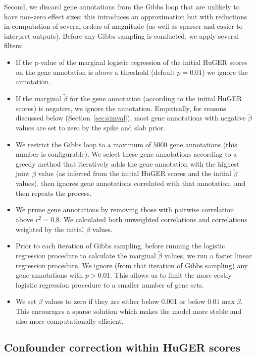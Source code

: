 {Second, we discard gene annotations from the Gibbs loop that are
unlikely to have non-zero effect sizes; this introduces an
approximation but with reductions in computation of several orders of
magnitude (as well as sparser and easier to interpret outputs). Before
any Gibbs sampling is conducted, we apply several filters:
\begin{itemize}
  \item If the p-value of the marginal logistic regression of the
    initial HuGER scores on the gene annotation is above a threshold
    (default $p=0.01$) we ignore the annotation.
  \item If the marginal $\tilde{\beta}$ for the gene annotation
    (according to the initial HuGER scores) is negative, we ignore the
    annotation. Empirically, for reasons discussed below (Section~\ref{sec:simval}),
    most gene annotations with negative $\tilde{\beta}$ values are set
    to zero by the spike and slab prior.
  \item We restrict the Gibbs loop to a maximum of $5000$ gene
    annotations (this number is configurable). We select these gene
    annotations according to a greedy method that iteratively adds the
    gene annotation with the highest joint $\beta$ value (as inferred from
    the initial HuGER scores and the initial $\tilde{\beta}$ values),
    then ignores gene annotations correlated with that annotation, and
    then repeats the process.
  \item We prune gene annotations by removing those with pairwise
    correlation above $r^2=0.8$. We calculated both unweighted
    correlations and correlations weighted by the initial $\beta$
    values.
  \item Prior to each iteration of Gibbs sampling, before running the
    logistic regression procedure to calculate the marginal
    $\tilde{\beta}$ values, we run a faster linear regression
    procedure. We ignore (from that iteration of Gibbs sampling) any
    gene annotations with $p>0.01$. This allows us to limit the more
    costly logistic regression procedure to a smaller number of gene sets.
  \item We set $\beta$ values to zero if they are either below 0.001 or
below $0.01\max{\beta}$. This encourages a sparse solution which makes
the model more stable and also more computationally efficient.

\end{itemize}

\subsection{Confounder correction within HuGER scores}

}
